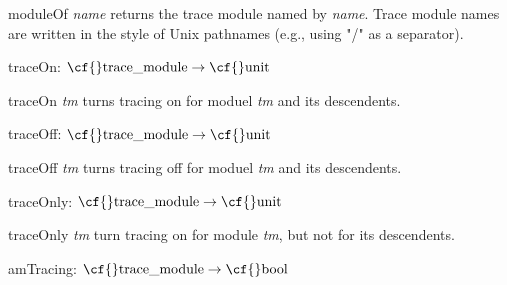 \begin{descr}
\begin{speccomment}
\item {\cf \small module\-Of \mbox{\cf \small \textit{name}}           } 
returns the trace module named by \mbox{\cf \small \textit{name}}. 	  Trace module names are written in the style of Unix pathnames 	  (e.\-g., using {\cf \small "/"} as a separator).     \end{speccomment}
\item {}{} {\cf traceOn: \(\mbox{\cf{}trace\_module}\rightarrow \mbox{\cf{}unit}\)}\label{val-TRACE_CML.traceOn}


\begin{speccomment}
\item {\cf \small trace\-On \mbox{\cf \small \textit{tm}}           } 
turns tracing on for moduel \mbox{\cf \small \textit{tm}} and its descendents.     \end{speccomment}
\item {}{} {\cf traceOff: \(\mbox{\cf{}trace\_module}\rightarrow \mbox{\cf{}unit}\)}\label{val-TRACE_CML.traceOff}


\begin{speccomment}
\item {\cf \small trace\-Off \mbox{\cf \small \textit{tm}}           } 
turns tracing off for moduel \mbox{\cf \small \textit{tm}} and its descendents.     \end{speccomment}
\item {}{} {\cf traceOnly: \(\mbox{\cf{}trace\_module}\rightarrow \mbox{\cf{}unit}\)}\label{val-TRACE_CML.traceOnly}


\begin{speccomment}
\item {\cf \small trace\-Only \mbox{\cf \small \textit{tm}}           } 
turn tracing on for module \mbox{\cf \small \textit{tm}}, but not for its descendents.     \end{speccomment}
\item {}{} {\cf amTracing: \(\mbox{\cf{}trace\_module}\rightarrow \mbox{\cf{}bool}\)}\label{val-TRACE_CML.amTracing}



\end{descr}
